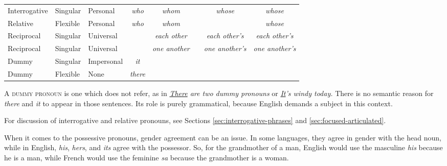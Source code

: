 \begin{sidewaystable}
\begin{tabular}{l l l c c c c c}
Interrogative & Singular & Personal & \textit{who} & \textit{whom} & & \textit{whose} & \textit{whose} \\
Relative & Flexible & Personal & \textit{who} & \textit{whom} & &  & \textit{whose} \\
Reciprocal & Singular & Universal &  & \textit{each other} & & \textit{each other's} & \textit{each other's} \\
Reciprocal & Singular & Universal &  & \textit{one another} & & \textit{one another's} & \textit{one another's} \\
Dummy & Singular & Impersonal & \textit{it} & & & & \\
Dummy & Flexible & None & \textit{there} & & & & \\
\hline
\end{tabular}
\end{sidewaystable}

A \textsc{dummy pronoun} is one which does not refer, as in \textit{\uline{There} are two dummy pronouns} or \textit{\uline{It}'s windy today.}\label{sec:dummy} There is no semantic reason for \textit{there} and \textit{it} to appear in those sentences. Its role is purely grammatical, because English demands a subject in this context.

For discussion of interrogative and relative pronouns, see Sections \ref{sec:interrogative-phrases} and \ref{sec:focused-articulated}.

When it comes to the possessive pronouns, gender agreement can be an issue. In some languages, they agree in gender with the head noun, while in English, \textit{his}, \textit{her\op\textit{s}\cp}, and \textit{its} agree with the possessor. So, for the grandmother of a man, English would use the masculine \textit{his} because he is a man, while French would use the feminine \textit{sa} because the grandmother is a woman.

\ea \label{ex:his-grandmother}
    \z
\ex \label{ex:her-grandmother}
    \z
\z

